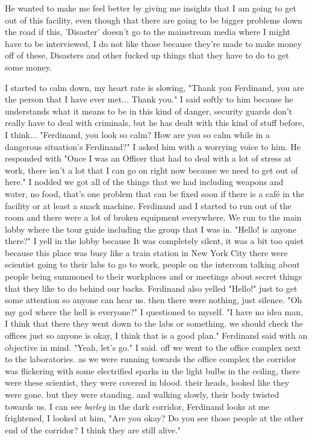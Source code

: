 \documentclass[14pt,letterpaper]{book}
\begin{document}
He wanted to make me feel better by giving me insights that I am going to get out of this facility, even though that there are going to be bigger problems down the road if this, 'Disaster' doesn't go to the mainstream media where I might have to be interviewed, I do not like those because they're made to make money off of these, Disasters and other fucked up things that they have to do to get some money.

I started to calm down, my heart rate is slowing, "Thank you Ferdinand, you are the person that I have ever met... Thank you." I said softly to him because he understands what it means to be in this kind of danger, security guards don't really have to deal with criminals, but he has dealt with this kind of stuff before, I think... "Ferdinand, you look so calm? How are you so calm while in a dangerous situation's Ferdinand?" I asked him with a worrying voice to him. He responded with "Once I was an Officer that had to deal with a lot of stress at work, there isn't a lot that I can go on right now because we need to get out of here." I nodded we got all of the things that we had including weapons and water, no food, that's one problem that can be fixed soon if there is a café in the facility or at least a snack machine. Ferdinand and I started to run out of the room and there were a lot of broken equipment everywhere. We run to the main lobby where the tour guide including the group that I was in. "Hello! is anyone there?" I yell in the lobby because It was completely silent, it was a bit too quiet because this place was busy like a train station in New York City there were scientist going to their labs to go to work, people on the intercom talking about people being summoned to their workplaces and or meetings about secret things that they like to do behind our backs.
Ferdinand also yelled "Hello!" just to get some attention so anyone can hear us. then there were nothing, just silence. "Oh my god where the hell is everyone?" I questioned to myself. "I have no idea man, I think that there they went down to the labs or something. we should check the offices just so anyone is okay, I think that is a good plan." Ferdinand said with an objective in mind. "Yeah, let's go." I said. off we went to the office complex next to the laboratories. as we were running towards the office complex the corridor was flickering with some electrified sparks in the light bulbs in the ceiling, there were these scientist, they were covered in blood. their heads, looked like they were gone. but they were standing. and walking slowly, their body twisted towards us. I can see \textit{barley} in the dark corridor, Ferdinand looks at me frightened, I looked at him, "Are you okay? Do you see those people at the other end of the corridor? I think they are still alive."
\end{document}
